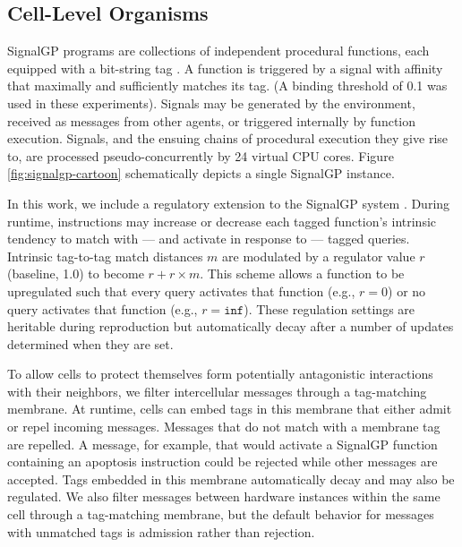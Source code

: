 \subsection{Cell-Level Organisms} \label{sup:cell_level_organisms}



SignalGP programs are collections of independent procedural functions, each equipped with a bit-string tag \cite{lalejini2018evolving}.
A function is triggered by a signal with affinity that maximally and sufficiently matches its tag.
(A binding threshold of 0.1 was used in these experiments).
Signals may be generated by the environment, received as messages from other agents, or triggered internally by function execution.
Signals, and the ensuing chains of procedural execution they give rise to, are processed pseudo-concurrently by 24 virtual CPU cores.
Figure \ref{fig:signalgp-cartoon} schematically depicts a single SignalGP instance.

In this work, we include a regulatory extension to the SignalGP system \cite{lalejini2021tag}.
During runtime, instructions may increase or decrease each tagged function's intrinsic tendency to match with --- and activate in response to --- tagged queries.
Intrinsic tag-to-tag match distances $m$ are modulated by a regulator value $r$ (baseline, 1.0) to become $r + r \times m$.
This scheme allows a function to be upregulated such that every query activates that function (e.g., $r = 0$) or no query activates that function (e.g., $r = \texttt{inf}$).
These regulation settings are heritable during reproduction but automatically decay after a number of updates determined when they are set.

To allow cells to protect themselves form potentially antagonistic interactions with their neighbors, we filter intercellular messages through a tag-matching membrane.
At runtime, cells can embed tags in this membrane that either admit or repel incoming messages.
Messages that do not match with a membrane tag are repelled.
A message, for example, that would activate a SignalGP function containing an apoptosis instruction could be rejected while other messages are accepted.
Tags embedded in this membrane automatically decay and may also be regulated.
We also filter messages between hardware instances within the same cell through a tag-matching membrane, but the default behavior for messages with unmatched tags is admission rather than rejection.

